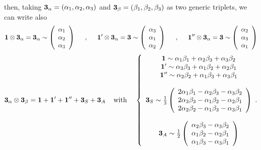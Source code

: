 \documentclass[a4paper,11pt]{article}
\begin{document}
then, taking ${\bf 3}_\alpha=(\alpha_1,\alpha_2,\alpha_3)$ and ${\bf 3}_\beta=(\beta_1,\beta_2,\beta_3)$ as two generic triplets, we can write also
\begin{equation}
\mathbf{1}\otimes\mathbf{3}_\alpha = \mathbf{3}_\alpha \sim \left(\begin{array}{c} \alpha_1 \\ \alpha_2 \\ \alpha_3\end{array}\right)\hspace{5mm},\hspace{5mm}
\mathbf{1'}\otimes\mathbf{3}_\alpha = \mathbf{3} \sim \left(\begin{array}{c} \alpha_3 \\ \alpha_1 \\ \alpha_2\end{array}\right)\hspace{5mm},\hspace{5mm}
\mathbf{1''}\otimes\mathbf{3}_\alpha = \mathbf{3} \sim \left(\begin{array}{c} \alpha_2 \\ \alpha_3 \\ \alpha_1\end{array}\right)
\end{equation}
\begin{equation}
\mathbf{3}_\alpha \otimes\mathbf{3}_\beta = \mathbf{1}+\mathbf{1'}+\mathbf{1''}+\mathbf{3}_S+\mathbf{3}_A \hspace{4mm}\mathrm{with}\hspace{4mm}  
\left\lbrace
\begin{array}{c} 
\mathbf{1}\sim \alpha_1\beta_1+\alpha_2\beta_3+\alpha_3\beta_2 \\ 
\mathbf{1'} \sim \alpha_3\beta_3+\alpha_1\beta_2+\alpha_2\beta_1 \\
\mathbf{1''} \sim \alpha_2\beta_2+\alpha_1\beta_3+\alpha_3\beta_1\\
\cr
\mathbf{3}_S \sim \frac{1}{3}\left(\begin{array}{c} 2\alpha_1\beta_1-\alpha_2\beta_3-\alpha_3\beta_2 \\2\alpha_3\beta_3-\alpha_1\beta_2-\alpha_2\beta_1 \\ 2\alpha_2\beta_2-\alpha_1\beta_3-\alpha_3\beta_1\end{array}\right)\\
\cr
\mathbf{3}_A \sim \frac{1}{2}\left(\begin{array}{c} \alpha_2\beta_3-\alpha_3\beta_2 \\\alpha_1\beta_2-\alpha_2\beta_1 \\ \alpha_1\beta_3-\alpha_3\beta_1\end{array}\right)\end{array}.
\right.
\end{equation}
\end{document}
